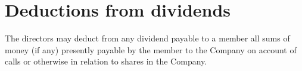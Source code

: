 \section{Deductions from dividends}

The directors may deduct from any dividend payable to a member all sums of money (if any) presently payable by the member to the Company on account of calls or otherwise in relation to shares in the Company. 